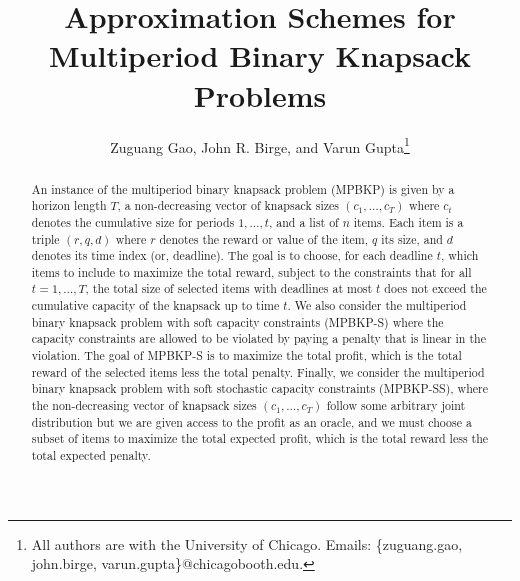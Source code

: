 \documentclass[11pt]{article}
\begin{document}
	\title{Approximation Schemes for Multiperiod Binary Knapsack Problems} 
	\author{Zuguang Gao, John R. Birge, and Varun Gupta\footnote{All authors are with the University of Chicago. Emails: \{zuguang.gao, john.birge, varun.gupta\}@chicagobooth.edu.}}
	\date{}

	\maketitle
	
	\begin{abstract}
		\begin{onehalfspace} 
			An instance of the multiperiod binary knapsack problem (MPBKP) is given by a horizon length $T$, a non-decreasing vector of knapsack sizes $(c_1, \ldots, c_T)$ where $c_t$ denotes the cumulative size for periods $1,\ldots,t$, and a list of $n$ items. Each item is a triple $(r, q, d)$ where $r$ denotes the reward or value of the item, $q$ its size, and $d$ denotes its time index (or, deadline). The goal is to choose, for each deadline $t$, which items to include to maximize the total reward, subject to the constraints that for all $t=1,\ldots,T$, the total size of selected items with deadlines at most $t$ does not exceed the cumulative capacity of the knapsack up to time $t$. We also consider the multiperiod binary knapsack problem with soft capacity constraints (MPBKP-S) where the capacity constraints are allowed to be violated by paying a penalty that is linear in the violation. The goal of MPBKP-S is to maximize the total profit, which is the total reward of the selected items less the total penalty. Finally, we consider the multiperiod binary knapsack problem with soft stochastic capacity constraints (MPBKP-SS), where the non-decreasing vector of knapsack sizes $(c_1, \ldots, c_T)$ follow some arbitrary joint distribution but we are given access to the profit as an oracle, and we must choose a subset of items to maximize the total expected profit, which is the total reward less the total expected penalty.



\end{onehalfspace}
\end{abstract}
\end{document}
